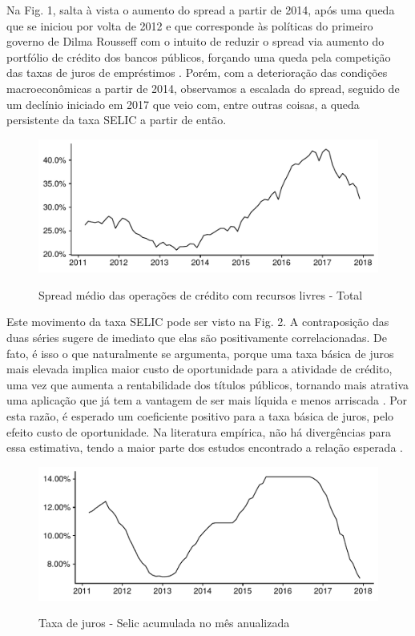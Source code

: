 \documentclass[a4paper, article, 12pt, openany, oneside, english, brazil]{abntex2}
\numberwithin{equation}{section}
\begin{document}
    Na Fig. 1, salta à vista o aumento do spread a partir de 2014, após uma queda que se iniciou por volta de 2012 e que corresponde às políticas do primeiro governo de Dilma Rousseff com o intuito de reduzir o spread via aumento do portfólio de crédito dos bancos públicos, forçando uma queda pela competição das taxas de juros de empréstimos \cite[p.~1]{almeida15}. Porém, com a deterioração das condições macroeconômicas a partir de 2014, observamos a escalada do spread, seguido de um declínio iniciado em 2017 que veio com, entre outras coisas, a queda persistente da taxa SELIC a partir de então.

\begin{figure}[h]
  \centering
    \caption{Spread médio das operações de crédito com recursos livres - Total}
      \includegraphics[width = \textwidth, scale=0.75]{Spread.pdf}
      \label{spread}
\end{figure}
    
Este movimento da taxa SELIC pode ser visto na Fig. 2. A contraposição das duas séries sugere de imediato que elas são positivamente correlacionadas. De fato, é isso o que naturalmente se argumenta, porque uma taxa básica de juros mais elevada implica maior custo de oportunidade para a atividade de crédito, uma vez que aumenta a rentabilidade dos títulos públicos, tornando mais atrativa uma aplicação que já tem a vantagem de ser mais líquida e menos arriscada \cite[p.~372]{oliveira2007}. Por esta razão, é esperado um coeficiente positivo para a taxa básica de juros, pelo efeito custo de oportunidade. Na literatura empírica, não há divergências para essa estimativa, tendo a maior parte dos estudos encontrado a relação esperada \cite[p.~233-234]{leal07}.

\begin{figure}[h]
  \centering
    \caption{Taxa de juros - Selic acumulada no mês anualizada}
      \includegraphics[width = \textwidth, scale=0.75]{Selic.pdf}
      \label{selic}
\end{figure}
    
\end{document}
